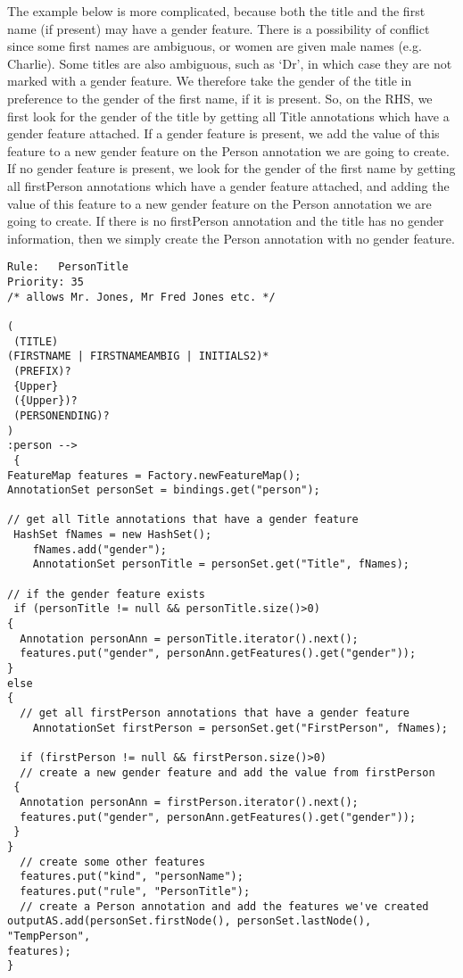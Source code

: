The example below is more complicated, because both the title and the
first name (if present) may have a gender feature. There is a
possibility of conflict since some first names are ambiguous, or women
are given male names (e.g. Charlie). Some titles are also ambiguous,
such as `Dr', in which case they are not marked with a gender
feature. We therefore take the gender of the title in preference to
the gender of the first name, if it is present. So, on the RHS, we
first look for the gender of the title by getting all Title
annotations which have a gender feature attached. If a gender feature
is present, we add the value of this feature to a new gender feature
on the Person annotation we are going to create. If no gender feature
is present, we look for the gender of the first name by getting all
firstPerson annotations which have a gender feature attached, and adding
the value of this feature to a new gender feature on the Person
annotation we are going to create. If there is no firstPerson
annotation and the title has no gender information, then we simply
create the Person annotation with no gender feature.

\begin{small}
\begin{verbatim}
Rule:	PersonTitle
Priority: 35
/* allows Mr. Jones, Mr Fred Jones etc. */
 
(
 (TITLE)
(FIRSTNAME | FIRSTNAMEAMBIG | INITIALS2)*
 (PREFIX)?
 {Upper}
 ({Upper})?
 (PERSONENDING)?
)
:person -->
 {
FeatureMap features = Factory.newFeatureMap();
AnnotationSet personSet = bindings.get("person");
  
// get all Title annotations that have a gender feature 
 HashSet fNames = new HashSet();
    fNames.add("gender");
    AnnotationSet personTitle = personSet.get("Title", fNames);

// if the gender feature exists
 if (personTitle != null && personTitle.size()>0)
{
  Annotation personAnn = personTitle.iterator().next();
  features.put("gender", personAnn.getFeatures().get("gender"));
}
else
{
  // get all firstPerson annotations that have a gender feature
    AnnotationSet firstPerson = personSet.get("FirstPerson", fNames);

  if (firstPerson != null && firstPerson.size()>0)
  // create a new gender feature and add the value from firstPerson
 {
  Annotation personAnn = firstPerson.iterator().next();
  features.put("gender", personAnn.getFeatures().get("gender"));
 }
}
  // create some other features
  features.put("kind", "personName");
  features.put("rule", "PersonTitle");
  // create a Person annotation and add the features we've created
outputAS.add(personSet.firstNode(), personSet.lastNode(), "TempPerson",
features);
}
\end{verbatim}
\end{small}


